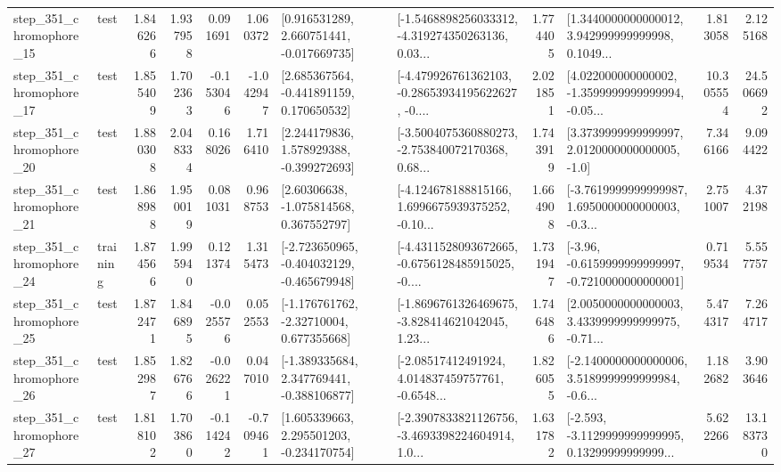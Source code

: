 \begin{tabular}{llrrrrllrlrr}
  step\_351\_chromophore\_15 &      test &      1.846266 &    1.937958 &      0.091691 &  1.060372 &    [0.916531289, 2.660751441, -0.017669735] &  [-1.5468898256033312, -4.319274350263136, 0.03... &       1.774405 &  [1.3440000000000012, 3.942999999999998, 0.1049... &            1.813058 &          2.125168 \\
  step\_351\_chromophore\_17 &      test &      1.855409 &    1.702363 &     -0.153046 & -1.042947 &    [2.685367564, -0.441891159, 0.170650532] &  [-4.479926761362103, -0.28653934195622627, -0.... &       2.021851 &  [4.022000000000002, -1.3599999999999994, -0.05... &           10.305554 &         24.506692 \\
  step\_351\_chromophore\_20 &      test &      1.880308 &    2.048334 &      0.168026 &  1.716410 &    [2.244179836, 1.578929388, -0.399272693] &  [-3.5004075360880273, -2.753840072170368, 0.68... &       1.743919 &     [3.3739999999999997, 2.0120000000000005, -1.0] &            7.346166 &          9.094422 \\
  step\_351\_chromophore\_21 &      test &      1.868988 &    1.950019 &      0.081031 &  0.968753 &     [2.60306638, -1.075814568, 0.367552797] &  [-4.124678188815166, 1.6996675939375252, -0.10... &       1.664908 &  [-3.7619999999999987, 1.6950000000000003, -0.3... &            2.751007 &          4.372198 \\
  step\_351\_chromophore\_24 &  training &      1.874566 &    1.995940 &      0.121374 &  1.315473 &  [-2.723650965, -0.404032129, -0.465679948] &  [-4.4311528093672665, -0.6756128485915025, -0.... &       1.731947 &  [-3.96, -0.6159999999999997, -0.7210000000000001] &            0.719534 &          5.557757 \\
  step\_351\_chromophore\_25 &      test &      1.872471 &    1.846895 &     -0.025576 &  0.052553 &    [-1.176761762, -2.32710004, 0.677355668] &  [-1.8696761326469675, -3.828414621042045, 1.23... &       1.746486 &  [2.0050000000000003, 3.4339999999999975, -0.71... &            5.474317 &          7.264717 \\
  step\_351\_chromophore\_26 &      test &      1.852987 &    1.826766 &     -0.026221 &  0.047010 &   [-1.389335684, 2.347769441, -0.388106877] &  [-2.08517412491924, 4.014837459757761, -0.6548... &       1.826055 &  [-2.1400000000000006, 3.5189999999999984, -0.6... &            1.182682 &          3.903646 \\
  step\_351\_chromophore\_27 &      test &      1.818102 &    1.703860 &     -0.114242 & -0.709461 &    [1.605339663, 2.295501203, -0.234170754] &  [-2.3907833821126756, -3.4693398224604914, 1.0... &       1.631782 &  [-2.593, -3.1129999999999995, 0.13299999999999... &            5.622266 &         13.183730 \\

\end{tabular}
